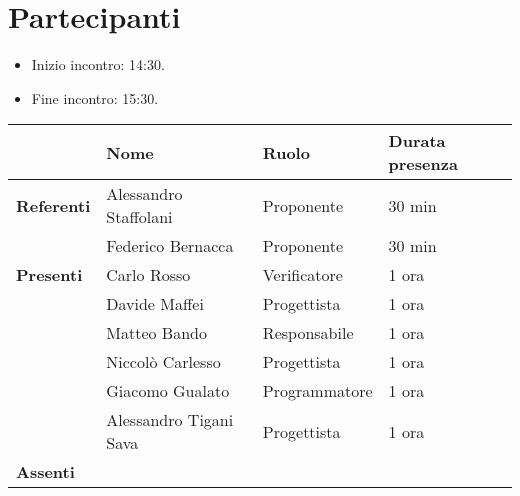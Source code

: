 \section*{Partecipanti}

\begin{itemize}
	\item Inizio incontro: 14:30.
	\item Fine incontro: 15:30.
\end{itemize}


\begin{center}
	{\renewcommand{\arraystretch}{1.5}
		\begin{tabular}{l|lll}
			                   	& \textbf{Nome}				& \textbf{Ruolo}	& \textbf{Durata presenza} \\
			\hline
			\textbf{Referenti} 	& Alessandro Staffolani  	& Proponente		& 30 min	\\
								& Federico Bernacca			& Proponente		& 30 min	\\
			\hline
			\textbf{Presenti} 	& Carlo Rosso            	& Verificatore    	& 1 ora	\\
								& Davide Maffei          	& Progettista   	& 1 ora	\\
								& Matteo Bando           	& Responsabile		& 1 ora	\\
								& Niccolò Carlesso       	& Progettista		& 1 ora	\\
								& Giacomo Gualato			& Programmatore		& 1 ora \\
								& Alessandro Tigani Sava 	& Progettista 		& 1 ora	\\
			\hline
			\textbf{Assenti}	
		\end{tabular}
	}
\end{center}
